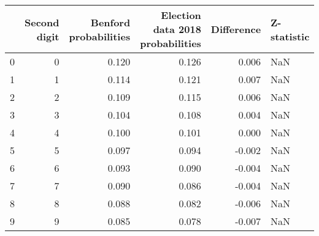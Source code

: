 \begin{tabular}{lrrrrl}
\toprule
 & Second digit & Benford probabilities & Election data 2018 probabilities & Difference & Z-statistic \\
\midrule
0 & 0 & 0.120 & 0.126 & 0.006 & NaN \\
1 & 1 & 0.114 & 0.121 & 0.007 & NaN \\
2 & 2 & 0.109 & 0.115 & 0.006 & NaN \\
3 & 3 & 0.104 & 0.108 & 0.004 & NaN \\
4 & 4 & 0.100 & 0.101 & 0.000 & NaN \\
5 & 5 & 0.097 & 0.094 & -0.002 & NaN \\
6 & 6 & 0.093 & 0.090 & -0.004 & NaN \\
7 & 7 & 0.090 & 0.086 & -0.004 & NaN \\
8 & 8 & 0.088 & 0.082 & -0.006 & NaN \\
9 & 9 & 0.085 & 0.078 & -0.007 & NaN \\
\bottomrule
\end{tabular}
